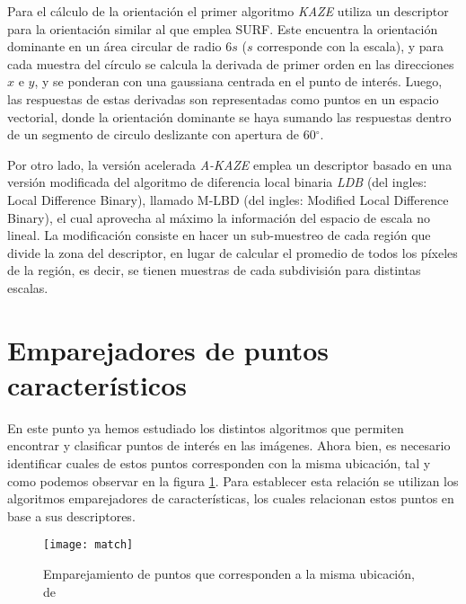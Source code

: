 Para el cálculo de la orientación el primer algoritmo \textit{KAZE} utiliza un descriptor para la orientación similar al que emplea SURF. Este encuentra la orientación dominante en un área circular de radio 6$s$ ($s$ corresponde con la escala), y para cada muestra del círculo se calcula la derivada de primer orden en las direcciones $x$ e $y$, y se ponderan con una gaussiana centrada en el punto de interés. Luego, las respuestas de estas derivadas son representadas como puntos en un espacio vectorial, donde la orientación dominante se haya sumando las respuestas dentro de un segmento de circulo deslizante con apertura de 60$^\circ$.

Por otro lado, la versión acelerada \textit{A-KAZE} emplea un descriptor basado en una versión modificada del algoritmo de diferencia local binaria \textit{LDB} \cite{ldb} (del ingles: Local Difference Binary), llamado M-LBD (del ingles: Modified Local Difference Binary), el cual aprovecha al máximo la información del espacio de escala no lineal. La modificación consiste en hacer un sub-muestreo de cada región que divide la zona del descriptor, en lugar de calcular el promedio de todos los píxeles de la región, es decir, se tienen muestras de cada subdivisión para distintas escalas.


\section{Emparejadores de puntos característicos}

En este punto ya hemos estudiado los distintos algoritmos que permiten encontrar y clasificar puntos de interés en las imágenes. Ahora bien, es necesario identificar cuales de estos puntos corresponden con la misma ubicación, tal y como podemos observar en la figura \ref*{imagen:match}. Para establecer esta relación se utilizan los algoritmos emparejadores de características, los cuales relacionan estos puntos en base a sus descriptores.

\begin{figure}[H]
	\centering
	\texttt{[image: match]}
	\caption[Emparejamiento de puntos característicos]{Emparejamiento de puntos que corresponden a la misma ubicación, de \cite{comp-vision} }
	\label{imagen:match}
\end{figure}

